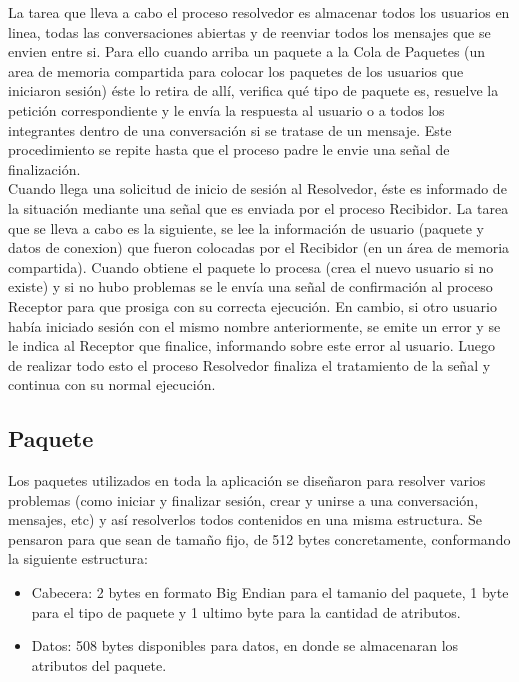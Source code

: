 \documentclass[a4paper,12pt,titlepage]{article}
\begin{document}
La tarea que lleva a cabo el proceso resolvedor es almacenar todos los usuarios en linea, todas las conversaciones abiertas y de reenviar 
todos los mensajes que se envien entre si. Para ello cuando arriba un paquete a la Cola de Paquetes (un area de memoria compartida para colocar 
los paquetes de los usuarios que iniciaron sesión) éste lo retira de allí, verifica qué tipo de paquete es, resuelve la petición correspondiente y 
le envía la respuesta al usuario o a todos los integrantes dentro de una conversación si se tratase de un mensaje. Este procedimiento se repite 
hasta que el proceso padre le envie una señal de finalización.\\

Cuando llega una solicitud de inicio de sesión al Resolvedor, éste es informado de la situación mediante una señal que es enviada por el proceso 
Recibidor. La tarea que se lleva a cabo es la siguiente, se lee la información de usuario (paquete y datos de conexion) que fueron colocadas por 
el Recibidor (en un área de memoria compartida). Cuando obtiene el paquete lo procesa (crea el nuevo usuario si no existe) y si no hubo problemas 
se le envía una señal de confirmación al proceso Receptor para que prosiga con su correcta ejecución. En cambio, si otro usuario había iniciado 
sesión con el mismo nombre anteriormente, se emite un error y se le indica al Receptor que finalice, informando sobre este error al usuario. Luego 
de realizar todo esto el proceso Resolvedor finaliza el tratamiento de la señal y continua con su normal ejecución.\\

\subsection{Paquete}
Los paquetes utilizados en toda la aplicación se diseñaron para resolver varios problemas (como iniciar y finalizar sesión, crear y unirse a una 
conversación, mensajes, etc) y así resolverlos todos contenidos en una misma estructura.
Se pensaron para que sean de tamaño fijo, de 512 bytes concretamente, conformando la siguiente estructura:

\begin{itemize}
\item Cabecera: 2 bytes en formato Big Endian para el tamanio del paquete, 1 byte para el tipo de paquete y 1 ultimo byte para la cantidad de atributos.
\item Datos: 508 bytes disponibles para datos, en donde se almacenaran los atributos del paquete.\\
\end{itemize}
\end{document}

